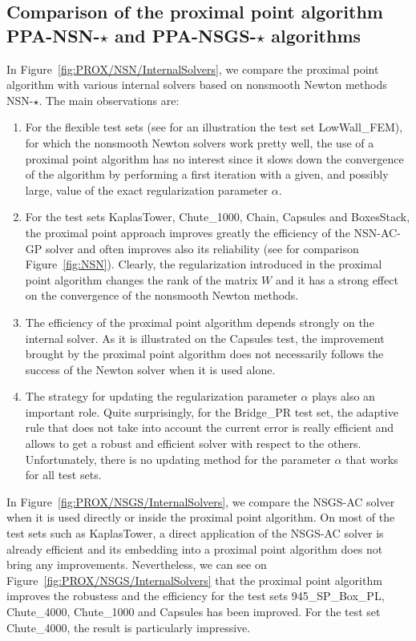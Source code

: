 \subsection{Comparison of the proximal point algorithm {\sf PPA-NSN-$\star$} and {\sf PPA-NSGS-$\star$}  algorithms}
\label{Sec:PROX/NSN/InternalSolvers}
In Figure~\ref{fig:PROX/NSN/InternalSolvers}, we compare the proximal point algorithm with various internal solvers based on nonsmooth Newton methods {\sf NSN-$\star$}. The main observations are:
\begin{enumerate}
\item For the flexible test sets (see for an illustration the test set LowWall\_FEM), for which the nonsmooth Newton solvers work pretty well, the use of a proximal point algorithm has no interest since it slows down the convergence of the algorithm by performing a first iteration with a given, and possibly large, value of the exact regularization parameter $\alpha$.
\item For the test sets KaplasTower,   Chute\_1000, Chain, Capsules and BoxesStack, the proximal point approach improves greatly the efficiency  of the {\sf NSN-AC-GP} solver and often improves also its reliability (see for comparison Figure~\ref{fig:NSN}). Clearly, the regularization introduced in the proximal point algorithm changes the rank of the matrix $W$ and it has a strong effect on the convergence of the nonsmooth  Newton methods.
\item The efficiency of the proximal point algorithm depends strongly  on the internal solver. As it is illustrated on the Capsules test, the improvement brought by the proximal point algorithm does not necessarily follows the success of the Newton solver when it is used alone.
\item The strategy for updating the regularization parameter $\alpha$ plays also an important role. Quite surprisingly, for the Bridge\_PR test set, the adaptive rule that does not take into account the current error is really efficient and allows to get a robust and efficient solver with respect to the others. Unfortunately, there is no updating method for the parameter $\alpha$ that works for all test sets.
\end{enumerate}
In Figure~\ref{fig:PROX/NSGS/InternalSolvers}, we compare the {\sf NSGS-AC} solver when it is used directly or inside the proximal point algorithm. On most of the test sets such as KaplasTower, a direct application of the {\sf NSGS-AC} solver is already efficient and its embedding into a proximal point algorithm does not bring any improvements. Nevertheless, we can see on Figure~\ref{fig:PROX/NSGS/InternalSolvers} that the proximal point algorithm improves the robustess and the efficiency for the test sets 945\_SP\_Box\_PL,  Chute\_4000, Chute\_1000 and Capsules has been improved. For the test set Chute\_4000, the result is particularly impressive.

